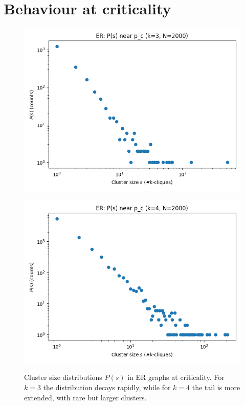 \section{Behaviour at criticality}

\begin{figure}[h!]
    \centering
    \setlength{\tabcolsep}{2pt}
    \begin{minipage}[t]{0.48\textwidth}
        \centering
        \includegraphics[width=\textwidth]{images/IMAGES TASK2/ER_Ps_k3_N2000.png}
        \label{fig:Ps_k3}
    \end{minipage}
    \hfill
    \begin{minipage}[t]{0.48\textwidth}
        \centering
        \includegraphics[width=\textwidth]{images/IMAGES TASK2/ER_Ps_k4_N2000.png}
        \label{fig:Ps_k4}
    \end{minipage}
    \caption{Cluster size distributions $P(s)$ in ER graphs at criticality. 
    For $k=3$ the distribution decays rapidly, while for $k=4$ the tail is more extended, 
    with rare but larger clusters.}
    \label{fig:Ps_ER}
\end{figure}

